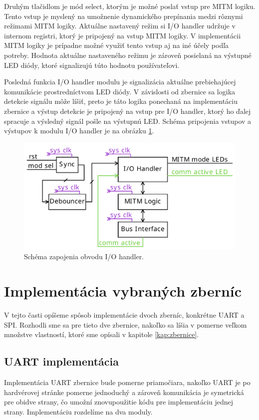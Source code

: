 Druhým tlačidlom je mód select, ktorým je možné poslať vstup pre MITM logiku. Tento vstup je myslený na umožnenie dynamického prepínania medzi rôznymi režimami MITM logiky. Aktuálne nastavený režim si I/O handler udržuje v internom registri, ktorý je pripojený na vstup MITM logiky. V implementácii MITM logiky je prípadne možné využiť tento vstup aj na iné účely podľa potreby. Hodnota aktuálne nastaveného režimu je zároveň posielaná na výstupné LED diódy, ktoré signalizujú túto hodnotu používateľovi.

Posledná funkcia I/O handler modulu je signalizácia aktuálne prebiehajúcej komunikácie prostredníctvom LED diódy. V závislosti od zbernice sa logika detekcie signálu môže líšiť, preto je táto logika ponechaná na implementáciu zbernice a výstup detekcie je pripojený na vstup pre I/O handler, ktorý ho ďalej spracuje a výsledný signál pošle na výstupnú LED. Schéma pripojenia vstupov a výstupov k modulu I/O handler je na obrázku \ref{obr:ioHandler}.

\begin{figure}
    \centerline{\includegraphics[width=1\textwidth]{images/designs/ioHandler.pdf}}
    \caption[Schéma zapojenia obvodu I/O handler]{Schéma zapojenia obvodu I/O handler.}
    \label{obr:ioHandler}
\end{figure}

\section{Implementácia vybraných zberníc}
V tejto časti opíšeme spôsob implementácie dvoch zberníc, konkrétne UART a SPI. Rozhodli sme sa pre tieto dve zbernice, nakoľko sa líšia v pomerne veľkom množstve vlastností, ktoré sme opísali v kapitole \ref{kap:zbernice}.

\subsection{UART implementácia}
Implementácia UART zbernice bude pomerne priamočiara, nakoľko UART je po hardvérovej stránke pomerne jednoduchý a zároveň komunikácia je symetrická pre obidve strany, čo umožní znovupoužitie kódu pre implementáciu jednej strany. Implementáciu rozdelíme na dva moduly.

